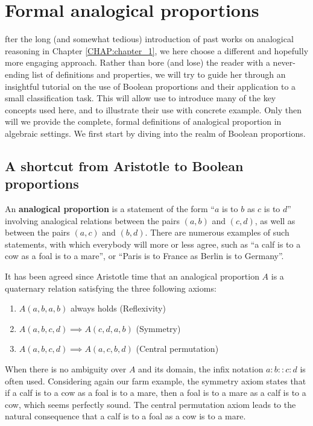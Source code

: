 \chapter{Formal analogical proportions}

fter the long (and somewhat tedious) introduction of past works on analogical
reasoning in Chapter \ref{CHAP:chapter_1}, we here choose a different and
hopefully more engaging approach. Rather than bore (and lose) the reader with a
never-ending list of definitions and properties, we will try to guide her
through an insightful tutorial on the use of Boolean proportions and their
application to a small classification task. This will allow use to introduce
many of the key concepts used here, and to illustrate their use with concrete
example. Only then will we provide the complete, formal definitions of
analogical proportion in algebraic settings. We first start by diving into the
realm of Boolean proportions.

\section{A shortcut from Aristotle to Boolean proportions}
\label{SEC:shortcut_from_aristotle_to_boolean_proportions}

An \textbf{analogical proportion} is a statement of the form ``$a$ is to $b$ as
$c$ is to $d$'' involving analogical relations between the pairs $(a,b)$ and
$(c,d)$, as well as between the pairs $(a,c)$ and $(b,d)$.  There are numerous
examples of such statements, with which everybody will more or less agree, such
as  ``a calf is to a cow as a foal is to a mare'', or ``Paris is to France as
Berlin is to Germany''.

It has been agreed since Aristotle time that an analogical proportion $A$ is a
quaternary relation satisfying the three following axioms:

\begin{enumerate}
\item $A(a,b,a,b)$ always holds (Reflexivity)
\item $A(a,b,c,d) \implies A(c,d,a,b)$ (Symmetry)
\item $A(a,b,c,d) \implies A(a,c,b,d)$ (Central permutation)
\end{enumerate}

When there is no ambiguity over $A$ and its domain, the infix notation
$a:b::c:d$ is often used. Considering again our farm example, the symmetry
axiom states that if a calf is to a cow as a foal is to a mare, then a foal is
to a mare as a calf is to a cow, which seems perfectly sound. The central
permutation axiom leads to the natural consequence that a calf is to a foal as
a cow is to a mare.

